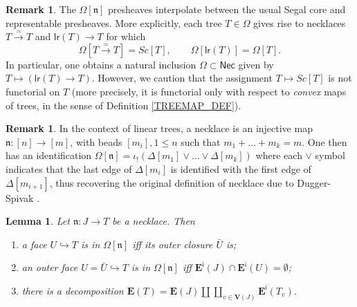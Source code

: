 \documentclass[a4paper,10pt
,draft
]{article}%
\numberwithin{equation}{section}
\numberwithin{figure}{section}
\newtheorem{lemma}[equation]{Lemma}%
\theoremstyle{definition} %
\newtheorem{remark}[equation]{Remark}%
\newcommand{\1}{\ensuremath{\mathbbm 1}}%
\begin{document}
\begin{remark}
	The $\Omega[\mathfrak{n}]$ presheaves
	interpolate between the usual 
	Segal core and representable presheaves.
	More explicitly,
	each tree $T \in \Omega$
	gives rise to necklaces
	$T \xrightarrow{=} T$ and
	$\mathsf{lr}(T) \to T$
	for which
        \[
                \Omega[T \xrightarrow{=} T] = Sc[T],
                \qquad
                \Omega[\mathsf{lr}(T)] = \Omega[T].
        \]
        In particular,
        one obtains a natural inclusion
        $\Omega \subset \mathsf{Nec}$
        given by $T \mapsto \left( \mathsf{lr}(T) \to T \right)$.
        However, we caution that the assignment
        $T \mapsto Sc[T]$ is not functorial on $T$
        (more precisely, it is functorial only with respect to \emph{convex} maps of trees,
        in the sense of Definition \ref{TREEMAP_DEF}). %
\end{remark}



\begin{remark}
	In the context of linear trees,
	a necklace is an injective map
	$\mathfrak{n} \colon [n] \to [m]$,
	with beads $[m_i], 1 \leq n$
	such that $m_1 + \dots + m_k = m$.
	One then has an identification
	$\Omega[\mathfrak n] =
	\iota_!(\Delta[m_1] \vee \dots \vee \Delta[m_k])$
	where each $\vee$ symbol
	indicates that the last edge of 
	$\Delta[m_i]$ is identified with the first edge of
	$\Delta[m_{i+1}]$,
	thus recovering the original definition of necklace 
	due to Dugger-Spivak \cite[\S 1]{DS11}.
\end{remark}



\begin{lemma}\label{FACEINNECK LEM}
	Let $\mathfrak{n} \colon J \to T$ be a necklace. Then
	\begin{enumerate}[label=(\roman*)]
		\item a face $U \hookrightarrow T$
		is in $\Omega[\mathfrak{n}]$
		iff its outer closure $\bar{U}$ is; 
		\item an outer face 
		$U = \bar{U} \hookrightarrow T$
		is in $\Omega[\mathfrak{n}]$ iff 
		$\boldsymbol{E}^{\mathsf{i}}(J) \cap 
		\boldsymbol{E}^{\mathsf{i}}(U) = \emptyset$;
		\item there is a decomposition
		$
		\boldsymbol{E}(T) = 
		\boldsymbol{E}(J) \amalg 
		\coprod_{v \in \boldsymbol{V}(J)}
		\boldsymbol{E}^{\mathsf{i}}(T_v)
		$.
	\end{enumerate}
\end{lemma}
\end{document}
